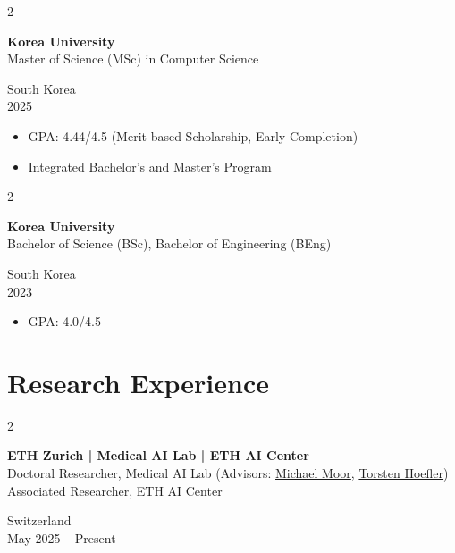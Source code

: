 \documentclass[11pt, letterpaper]{article}
\newenvironment{highlights}{
    \begin{itemize}[
        topsep=0.10 cm,
        parsep=0.10 cm,
        partopsep=0pt,
        itemsep=0pt,
        leftmargin=0 cm + 10pt
    ]
}{
    \end{itemize}
} %
\newenvironment{twocolentry}[2][]{
    \onecolentry
    \def\secondColumn{#2}
    \setcolumnwidth{\fill, 4.8 cm}
    \begin{paracol}{2}
}{
    \switchcolumn \raggedleft \secondColumn
    \end{paracol}
    \endonecolentry
} %
\begin{document}
        \begin{twocolentry}{
        South Korea\\
        2025
        }
        \textbf{Korea University}\\
        Master of Science (MSc) in Computer Science
        
        \end{twocolentry}
        
        \begin{highlights}
            \item GPA: 4.44/4.5 (Merit-based Scholarship, Early Completion)
            \\
            \item Integrated Bachelor's and Master's Program
            \\
        \end{highlights}
        \vspace{0.2 cm}

        \begin{twocolentry}{
            South Korea\\
            2023
        }
            \textbf{Korea University}\\Bachelor of Science (BSc), Bachelor of Engineering (BEng)
        \end{twocolentry}

        \begin{highlights}
            \item GPA: 4.0/4.5
             \\
        \end{highlights}
    \vspace{0.2 cm}

\section{Research Experience}
\vspace{0.2 cm}
\begin{twocolentry}{
    Switzerland\\
    May 2025 -- Present
}
\textbf{ETH Zurich | Medical AI Lab | ETH AI Center} \href{https://bsse.ethz.ch/mail}{\faExternalLink*}\\
Doctoral Researcher, Medical AI Lab (Advisors: \href{https://www.michaelmoor.me/}{Michael Moor}, \href{https://htor.ethz.ch/}{Torsten Hoefler}) \\
Associated Researcher, ETH AI Center
\end{twocolentry}
\vspace{0.2 cm}
\end{document}
